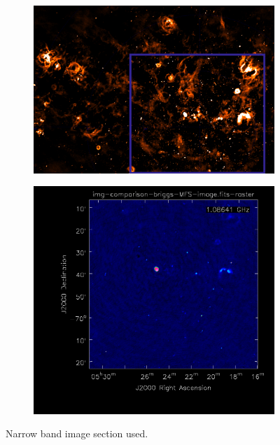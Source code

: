 \begin{figure}[h]
	\centering
	\begin{subfigure}[b]{0.4\linewidth}
		\includegraphics[width=1.0\linewidth]{./chapters/10.results/LMC/meerkat_cutout.png}
	\end{subfigure}
	\begin{subfigure}[b]{0.30\linewidth}
		\includegraphics[width=1.0\linewidth]{./chapters/10.results/cleancomp/clean_briggs.png}
	\end{subfigure}
	\caption{Narrow band image section used.}
	\label{results:cutout}
\end{figure}

